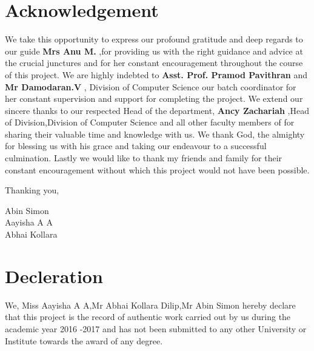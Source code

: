 \documentclass{article}
\begin{document}
\vspace*{\fill}

\newpage


\section{Acknowledgement}
\vspace{1em}

\Large
We take this opportunity to express our profound gratitude and deep regards to our guide \textbf{Mrs Anu M.}
,for providing us with the right guidance and advice at the crucial junctures and for her constant encouragement throughout the course of this project. We are highly indebted to \textbf{Asst. Prof. Pramod Pavithran}
 and \textbf{Mr Damodaran.V}
 , Division of Computer Science our batch coordinator for her constant supervision and support for completing the project. We extend our sincere thanks to our respected Head of the department, \textbf{Ancy Zachariah}
 ,Head of Division,Division of Computer Science and all other faculty members of for sharing their valuable time and knowledge with us. We thank God, the almighty for blessing us with his grace and taking our endeavour to a successful culmination. Lastly we would like to thank my friends and family for their constant encouragement without which this project would not have been possible.
 
 \begin{flushright}
 
  \vspace{2em}
  
 \Large
 Thanking you,\\
 \vspace{1em}
 
 \Large
 Abin Simon\\
 Aayisha A A\\
 Abhai Kollara\\
 
 \end{flushright}


\newpage

\section{Decleration}
\vspace{1em}
\Large
We, Miss Aayisha A A,Mr Abhai Kollara Dilip,Mr Abin Simon hereby declare that this project is the record of authentic work carried out by us during the academic year 2016 -2017 and has not been submitted to any other University or Institute towards the award of any degree.
\end{document}
